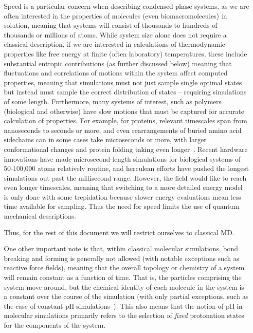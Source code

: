 \documentclass[9pt,bestpractices]{livecoms}
\begin{document}
Speed is a particular concern when describing condensed phase systems, as we are often interested in the properties of molecules (even biomacromolecules) in solution, meaning that systems will consist of thousands to hundreds of thousands or millions of atoms.
While system size alone does not require a classical description, if we are interested in calculations of thermodynamic properties like free energy at finite (often laboratory) temperatures, these include substantial entropic contributions (as further discussed below) meaning that fluctuations and correlations of motions within the system affect computed properties, meaning that simulations must not just sample single optimal states but instead must sample the correct distribution of states -- requiring simulations of some length.
Furthermore, many systems of interest, such as polymers (biological and otherwise) have slow motions that must be captured for accurate calculation of properties.
For example, for proteins, relevant timescales span from nanoseconds to seconds or more, and even rearrangements of buried amino acid sidechains can in some cases take microseconds or more, with larger conformational changes and protein folding taking even longer~\cite{Schlick:2010:, Mobley:2012:JComputAidedMolDes}. 
Recent hardware innovations have made microsecond-length simulations for biological systems of 50-100,000 atoms relatively routine, and herculean efforts have pushed the longest simulations out past the millisecond range.
However, the field would like to reach even longer timescales, meaning that switching to a more detailed energy model is only done with some trepidation because slower energy evaluations mean less time available for sampling. 
Thus the need for speed limits the use of quantum mechanical descriptions.

Thus, for the rest of this document we will restrict ourselves to classical MD.

One other important note is that, within classical molecular simulations, bond breaking and forming is generally not allowed (with notable exceptions such as reactive force fields),  meaning that the overall topology or chemistry of a system will remain constant as a function of time.
That is, the particles comprising the system move around, but the chemical identity of each molecule in the system is a constant over the course of the simulation (with only partial exceptions, such as the case of constant pH simulations~\cite{Chen:2014:Mol.Simul.}).
This also means that the notion of pH in molecular simulations primarily refers to the selection of \emph{fixed} protonation states for the components of the system.
\end{document}

